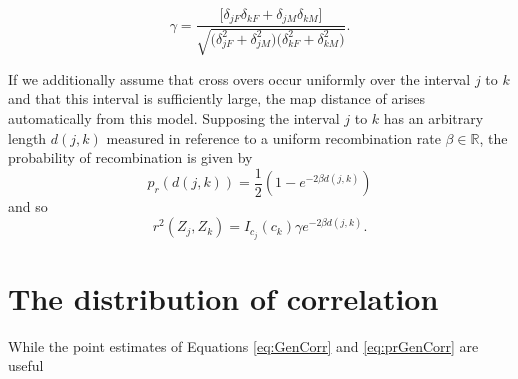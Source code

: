 \documentclass{article}
\newcommand{\ind}[2]{I_{#2} \left( #1 \right)}
\newcommand{\corr}{r^2}
\newcommand{\field}[1]{\mathbb{#1}}
\newcommand{\Reals}{\field{R}}
\begin{document}
$$\gamma = \frac{ \Big [ \delta_{jF} \delta_{kF} + \delta_{jM} \delta_{kM} \Big ] }{  \sqrt{ \big ( \delta_{jF}^2 + \delta_{jM}^2 \big ) \big ( \delta_{kF}^2 + \delta_{kM}^2 \big )}}.$$

If we additionally assume that cross overs occur uniformly over the interval $j$ to $k$ and that this interval is sufficiently large, the map distance of \cite{haldane1919} arises automatically from this model. Supposing the interval $j$ to $k$ has an arbitrary length $d(j,k)$ measured in reference to a uniform recombination rate $\beta \in \Reals$, the probability of recombination is given by
$$p_r(d(j,k)) = \frac{1}{2} \left ( 1 - e^{-2\beta d(j,k)} \right )$$
and so
\begin{equation} \label{eq:GenCorr}
  \corr(Z_j, Z_k) = \ind{c_k}{c_j} \gamma e^{-2 \beta d(j,k)}.
\end{equation}

\section{The distribution of correlation} \label{sec:distribution}

While the point estimates of Equations \ref{eq:GenCorr} and \ref{eq:prGenCorr} are useful



\renewcommand*{\bibname}{References} %

\end{document}

